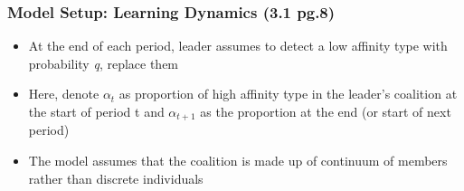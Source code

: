 \documentclass[10pt,handout]{beamer}
\begin{document}
\begin{frame}
\frametitle{Model Setup: Learning Dynamics (3.1 pg.8)}
\begin{itemize}
    \item At the end of each period, leader assumes to detect a low affinity type with probability \textit{q}, replace them
    \item Here, denote $\alpha_t$ as proportion of high affinity type in the leader's coalition at the start of period t and $\alpha_{t+1}$ as the proportion at the end (or start of next period)
    \item The model assumes that the coalition is made up of continuum of members rather than discrete individuals
\end{itemize}
\end{frame}
\end{document}
